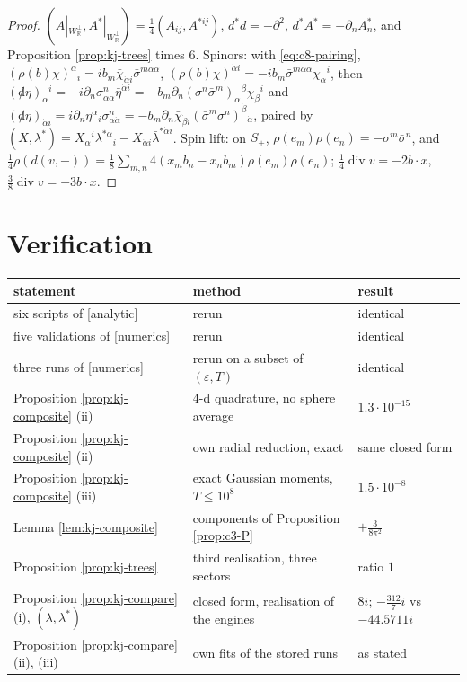 \begin{proof}
$(A|_{W_{\mathbb R}^\perp},A^*|_{W_{\mathbb R}^\perp})=\tfrac14(A_{ij},A^{*ij})$, $d^*d=-\partial^2$, $d^*A^*=-\partial_nA^*_n$, and Proposition \ref{prop:kj-trees} times $6$. Spinors: with \eqref{eq:c8-pairing}, $(\rho(b)\chi)^\alpha{}_i=ib_m\bar\chi_{\dot\alpha i}\bar\sigma^{m\dot\alpha\alpha}$, $(\rho(b)\chi)^{\dot\alpha i}=-ib_m\bar\sigma^{m\dot\alpha\alpha}\chi_\alpha{}^i$, then $({\not d}\eta)_\alpha{}^i=-i\partial_n\sigma^n_{\alpha\dot\alpha}\bar\eta^{\dot\alpha i}=-b_m\partial_n(\sigma^n\bar\sigma^m)_\alpha{}^\beta\chi_\beta{}^i$ and $({\not d}\eta)_{\dot\alpha i}=i\partial_n\eta^\alpha{}_i\sigma^n_{\alpha\dot\alpha}=-b_m\partial_n\bar\chi_{\dot\beta i}(\bar\sigma^m\sigma^n)^{\dot\beta}{}_{\dot\alpha}$, paired by $(X,\lambda^*)=X_\alpha{}^i\lambda^{*\alpha}{}_i-X_{\dot\alpha i}\bar\lambda^{*\dot\alpha i}$. Spin lift: on $S_+$, $\rho(e_m)\rho(e_n)=-\sigma^m\bar\sigma^n$, and $\tfrac14\rho(d(v,-))=\tfrac18\sum_{m,n}4(x_mb_n-x_nb_m)\rho(e_m)\rho(e_n)$; $\tfrac14\operatorname{div}v=-2b\cdot x$, $\tfrac38\operatorname{div}v=-3b\cdot x$.
\end{proof}

\section{Verification}

\begin{tabular}{l|l|l}
statement & method & result \\
\hline
six scripts of [analytic] & rerun & identical \\
five validations of [numerics] & rerun & identical \\
three runs of [numerics] & rerun on a subset of $(\varepsilon,T)$ & identical \\
Proposition \ref{prop:kj-composite} (ii) & 4-d quadrature, no sphere average & $1.3\cdot10^{-15}$ \\
Proposition \ref{prop:kj-composite} (ii) & own radial reduction, exact & same closed form \\
Proposition \ref{prop:kj-composite} (iii) & exact Gaussian moments, $T\le10^8$ & $1.5\cdot10^{-8}$ \\
Lemma \ref{lem:kj-composite} & components of Proposition \ref{prop:c3-P} & $+\tfrac{3}{8\pi^2}$ \\
Proposition \ref{prop:kj-trees} & third realisation, three sectors & ratio $1$ \\
Proposition \ref{prop:kj-compare} (i), $(\lambda,\lambda^*)$ & closed form, realisation of the engines & $8i$; $-\tfrac{312}{7}i$ vs $-44.5711i$ \\
Proposition \ref{prop:kj-compare} (ii), (iii) & own fits of the stored runs & as stated \\
\end{tabular}
